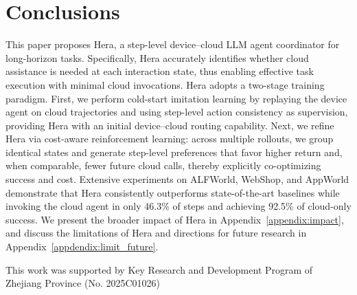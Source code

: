\documentclass{article}
\newcommand{\needrev}[1]{{\color{darkgreen}#1}} %
\newcommand{\needrev}[1]{#1} %
\newcommand{\name}{Hera\xspace}
\begin{document}


\section{Conclusions}

This paper proposes \name, a step-level device--cloud LLM agent coordinator for long-horizon tasks. Specifically, \name accurately identifies whether cloud assistance is needed at each interaction state, thus enabling effective task execution with minimal cloud invocations. \name adopts a two-stage training paradigm. First, we perform cold-start imitation learning by replaying the device agent on cloud trajectories and using step-level action consistency as supervision, providing \name with an initial device--cloud routing capability.
Next, we refine \name via cost-aware reinforcement learning: across multiple rollouts, we group identical states and generate step-level preferences that favor higher return and, when comparable, fewer future cloud calls, thereby explicitly co-optimizing success and cost.
Extensive experiments on ALFWorld, WebShop, and AppWorld demonstrate that \name consistently outperforms state-of-the-art baselines while invoking the cloud agent in only 46.3\% of steps and achieving 92.5\% of cloud-only success.
We present the broader impact of \name in Appendix~\ref{appendix:impact}, and discuss the limitations of \name and directions for future research in Appendix~\ref{appdendix:limit_future}.



\begin{ack}
This work was supported by Key Research and Development Program of Zhejiang Province (No. 2025C01026)
\end{ack}

\end{document}
